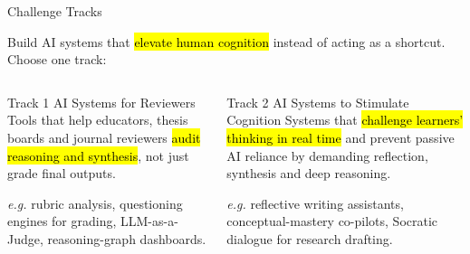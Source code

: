 \begin{frame}{Challenge Tracks}
  \begin{center}
    {\small\color{charalMuted}Build AI systems that \hl{elevate human cognition} instead of acting as a shortcut.
    Choose one track:}
  \end{center}
  \vspace{1mm}
  \begin{columns}[T, onlytextwidth]
    \begin{charalcard}{Track 1 \textperiodcentered{} AI Systems for Reviewers}
      Tools that help educators, thesis boards and journal reviewers \hl{audit reasoning and synthesis},
      not just grade final outputs.\par\vskip2mm
      {\color{charalMuted}\textit{e.g.} rubric analysis, questioning engines for grading,
      LLM-as-a-Judge, reasoning-graph dashboards.}\par\vskip2mm
    \end{charalcard}
    \begin{charalcard}{Track 2 \textperiodcentered{} AI Systems to Stimulate Cognition}
      Systems that \hl{challenge learners' thinking in real time} and prevent passive AI reliance
      by demanding reflection, synthesis and deep reasoning.\par\vskip2mm
      {\color{charalMuted}\textit{e.g.} reflective writing assistants, conceptual-mastery co-pilots,
      Socratic dialogue for research drafting.}\par\vskip2mm
    \end{charalcard}
  \end{columns}
\end{frame}
